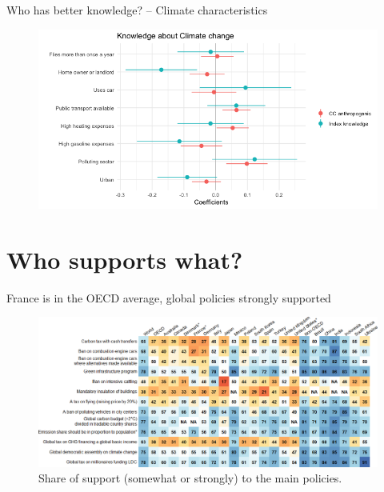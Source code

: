 \begin{framefont}{\small}
\begin{frame}{Who has better knowledge? -- Climate characteristics}

\begin{figure}
	\includegraphics[width=.9\paperwidth]{../figures/FR/reg_anthropogenic_knowledge_AB_FR.png}
\end{figure}
\end{frame}

\section{Who supports what?}%

\begin{frame}{France is in the OECD average, global policies strongly supported}
	\begin{figure}[h!]
		\centering		
		\caption{Share of support (somewhat or strongly) to the main policies.}
		\includegraphics[width=\textwidth]{../figures/country_comparison/main_policies_positive_countries.png}
		\end{figure}
\end{frame}


\end{framefont}
